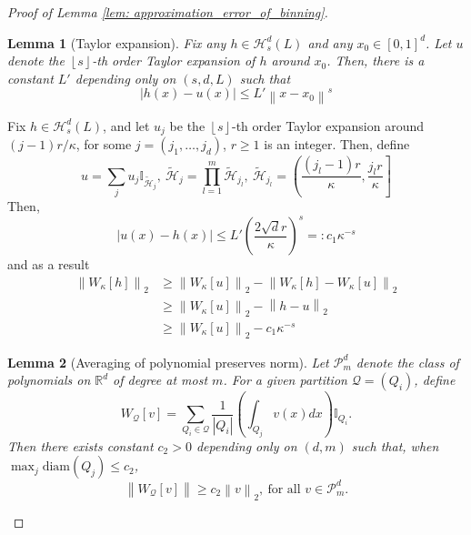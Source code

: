 \documentclass{article}
\newcommand{\Reals}{\mathbb{R}}
\newcommand{\norm}[1]{\left\lVert#1\right\rVert}
\newcommand{\abs}[1]{\left \lvert #1 \right \rvert}
\newcommand{\floor}[1]{\left\lfloor #1 \right\rfloor}
\newcommand{\diam}{\mathrm{diam}}
\newcommand{\1}{\mathbb{I}}
\newcommand{\Hclass}{\mathcal{H}}
\newcommand{\Pclass}{\mathcal{P}}
\theoremstyle{alden}
\theoremstyle{aldenthm}
\newtheorem{lemma}{Lemma}
\theoremstyle{definition}
\theoremstyle{remark}
\begin{document}
\begin{proof}[Proof of Lemma \ref{lem: approximation_error_of_binning}]
	
	\begin{lemma}[Taylor expansion]
		\label{lem: taylor_expansion}
		Fix any $h \in \Hclass_s^d(L)$ and any $x_0 \in [0,1]^d$. Let $u$ denote the $\floor{s}$-th order Taylor expansion of $h$ around $x_0$. Then, there is a constant $L'$ depending only on $(s,d,L)$ such that
		\begin{equation*}
		\abs{h(x) - u(x)} \leq L' \norm{x - x_0}^s \tag{$\forall u \in [0,1]^d$}
		\end{equation*}
	\end{lemma}

	Fix $h \in \Hclass_s^d(L)$, and let $u_j$ be the $\floor{s}$-th order Taylor expansion around $(j - 1)r/\kappa$, for some $j = (j_1,\ldots,j_d)$, $r \geq 1$ is an integer. Then, define
	\begin{equation*}
	u = \sum_{j} u_j \1_{\widetilde{\Hclass}_j},~ \widetilde{\Hclass}_j = \prod_{l = 1}^{m} \widetilde{\Hclass}_{j_l},~ \widetilde{\Hclass}_{j_l} = \left( \frac{(j_l - 1)r}{\kappa}, \frac{j_l r}{\kappa} \right]
	\end{equation*}
	Then,
	\begin{equation*}
	\abs{u(x) - h(x)} \leq L'\left(\frac{2\sqrt{d} r}{\kappa}\right)^s =: c_1 \kappa^{-s}
	\end{equation*}
	and as a result
	\begin{align*}
	\norm{W_{\kappa}[h]}_2 & \geq \norm{W_{\kappa}[u]}_2 - \norm{W_{\kappa}[h] - W_{\kappa}[u]}_2 \\
	& \geq \norm{W_{\kappa}[u]}_2 - \norm{h - u}_2 \\
	& \geq \norm{W_{\kappa}[u]}_2 - c_1 \kappa^{-s}
	\end{align*}
	
	\begin{lemma}[Averaging of polynomial preserves norm]
		\label{lem: averaging_of_polynomial_preserves_norm}
		Let $\Pclass_m^d$ denote the class of polynomials on $\Reals^d$ of degree at most $m$. For a given partition $\mathcal{Q} = (Q_i)$, define
		\begin{equation*}
		W_{\mathcal{Q}}[v] = \sum_{Q_i \in \mathcal{Q}} \frac{1}{\abs{Q_i}} \left(\int_{Q_j} v(x) dx\right) \1_{Q_i}.
		\end{equation*}
		Then there exists constant $c_2 > 0$ depending only on $(d,m)$ such that, when $\max_{j} \diam(Q_j) \leq c_2$,
		\begin{equation*}
		\norm{W_{\mathcal{Q}}[v]} \geq c_2 \norm{v}_2,~ \text{for all $v \in \Pclass_m^d$}.
		\end{equation*}
	\end{lemma}
\end{proof}
\end{document}
